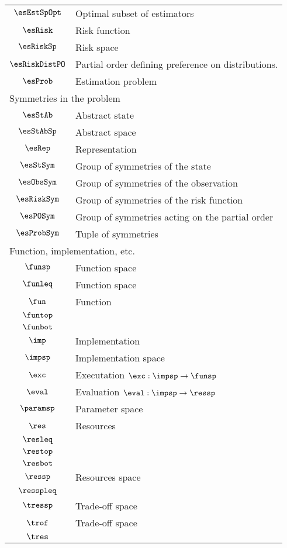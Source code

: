 \begin{longtable}{cl}
 $\esEstSpOpt$ &  Optimal subset of estimators\\ 
 $\esRisk$ &  Risk function\\ 
 $\esRiskSp$ &  Risk space\\ 
 $\esRiskDistPO$ &  Partial order defining preference on distributions.\\ 
 $\esProb$ &  Estimation problem\\ 
 \multicolumn{2}{l}{Symmetries in the problem}\\ 
 \hline
$\esStAb$ &  Abstract state\\ 
 $\esStAbSp$ &  Abstract space\\ 
 $\esRep$ &  Representation\\ 
 $\esStSym$ &  Group of symmetries of the state\\ 
 $\esObsSym$ &  Group of symmetries of the observation\\ 
 $\esRiskSym$ &  Group of symmetries of the risk function\\ 
 $\esPOSym$ &  Group of symmetries acting on the partial order\\ 
 $\esProbSym$ &  Tuple of symmetries\\ 
 \multicolumn{2}{l}{Function, implementation, etc.}\\ 
 \hline
$\funsp$ &  Function space\\ 
 $\funleq$ &  Function space\\ 
 $\fun$ &  Function\\ 
 $\funtop$ & \\ 
 $\funbot$ & \\ 
 $\imp$ &  Implementation\\ 
 $\impsp$ &  Implementation space\\ 
 $\exc$ &  Executation $\exc: \impsp \rightarrow \funsp$\\ 
 $\eval$ &  Evaluation $\eval: \impsp \rightarrow \ressp$\\ 
 $\paramsp$ &  Parameter space\\ 
 $\res$ &  Resources\\ 
 $\resleq$ & \\ 
 $\restop$ & \\ 
 $\resbot$ & \\ 
 $\ressp$ &  Resources space\\ 
 $\resspleq$ & \\ 
 $\tressp$ &  Trade-off space\\ 
 $\trof$ &  Trade-off space\\ 
 $\tres$ & \\ 

\end{longtable}
